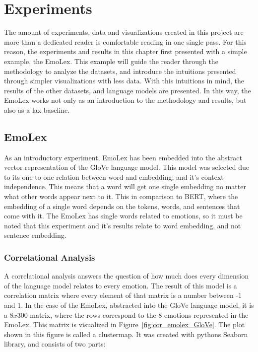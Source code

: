 \chapter{Experiments}\label{chap:Experiments}
The amount of experiments, data and visualizations created in this project are more than a dedicated reader is comfortable reading in one single pass. For this reason, the experiments and results in this chapter first presented with a simple example, the EmoLex. This example will guide the reader through the methodology to analyze the datasets, and introduce the intuitions presented through simpler visualizations with less data. With this intuitions in mind, the results of the other datasets, and language models are presented. In this way, the EmoLex works not only as an introduction to the methodology and results, but also as a lax baseline.

\section{EmoLex}\label{sec:EmoLex}
As an introductory experiment, EmoLex has been embedded into the abstract vector representation of the GloVe language model. This model was selected due to its one-to-one relation between word and embedding, and it's context independence. This means that a word will get one single embedding no matter what other words appear next to it. This in comparison to BERT, where the embedding of a single word depends on the tokens, words, and sentences that come with it. The EmoLex has single words related to emotions, so it must be noted that this experiment and it's results relate to word embedding, and not sentence embedding.

\subsection{Correlational Analysis}
A correlational analysis answers the question of how much does every dimension of the language model relates to every emotion. The result of this model is a correlation matrix where every element of that matrix is a number between -1 and 1.
In the case of the EmoLex, abstracted into the GloVe language model, it is a $8x300$ matrix, where the rows correspond to the 8 emotions represented in the EmoLex. This matrix is visualized in Figure~\ref{fig:cor_emolex_GloVe}. The plot shown in this figure is called a clustermap. It was created with pythons Seaborn library, and consists of two parts:

